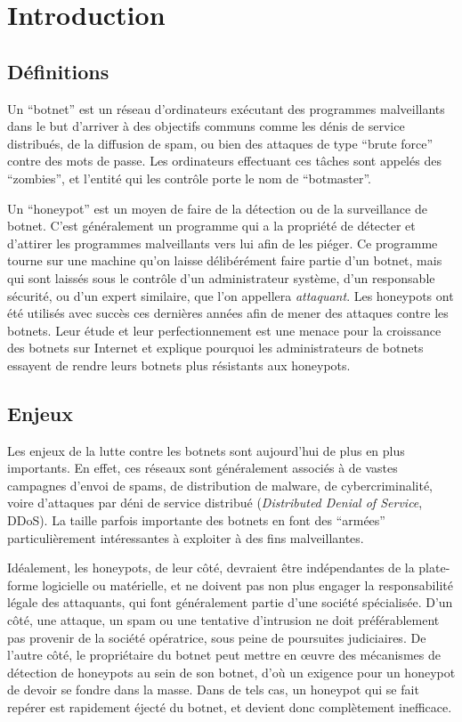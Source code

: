 \section{Introduction}

\subsection{Définitions}

Un ``botnet'' est un réseau d'ordinateurs exécutant des programmes malveillants
dans le but d'arriver à des objectifs communs comme les dénis de service distribués,
de la diffusion de spam, ou bien des attaques de type ``brute force'' contre
des mots de passe. Les ordinateurs effectuant ces tâches sont appelés des
``zombies'', et l'entité qui les contrôle porte le nom de ``botmaster''.

Un ``honeypot'' est un moyen de faire de la détection ou de la surveillance de
botnet. C'est généralement un programme qui a la propriété de détecter et
d'attirer les programmes malveillants vers lui afin de les piéger.  Ce
programme tourne sur une machine qu'on laisse délibérément faire partie d'un
botnet, mais qui sont laissés sous le contrôle d'un administrateur système,
d'un responsable sécurité, ou d'un expert similaire, que l'on appellera
\textit{attaquant}.  Les honeypots ont été utilisés avec succès ces dernières
années afin de mener des attaques contre les botnets. Leur étude et leur
perfectionnement est une menace pour la croissance des botnets sur Internet et
explique pourquoi les administrateurs de botnets essayent de rendre leurs
botnets plus résistants aux honeypots.

\subsection{Enjeux}

Les enjeux de la lutte contre les botnets sont aujourd'hui de plus en plus
importants. En effet, ces réseaux sont généralement associés à de vastes
campagnes d'envoi de spams, de distribution de malware, de cybercriminalité,
voire d'attaques par déni de service distribué (\textit{Distributed Denial of
Service}, DDoS).  La taille parfois importante des botnets en font des
``armées'' particulièrement intéressantes à exploiter à des fins
malveil\-lantes.

Idéalement, les honeypots, de leur côté, devraient être indépendantes de la
plate-forme logicielle ou matérielle, et ne doivent pas non plus engager la
responsabilité légale des attaquants, qui font généralement partie d'une
société spécialisée.  D'un côté, une attaque, un spam ou une tentative
d'intrusion ne doit préférablement pas provenir de la société opératrice, sous
peine de poursuites judiciaires. De l'autre côté, le propriétaire du botnet
peut mettre en œuvre des mécanismes de détection de honeypots au sein de son
botnet, d'où un exigence pour un honeypot de devoir se fondre dans la masse.
Dans de tels cas, un honeypot qui se fait repérer est rapidement éjecté du
botnet, et devient donc complètement inefficace.

